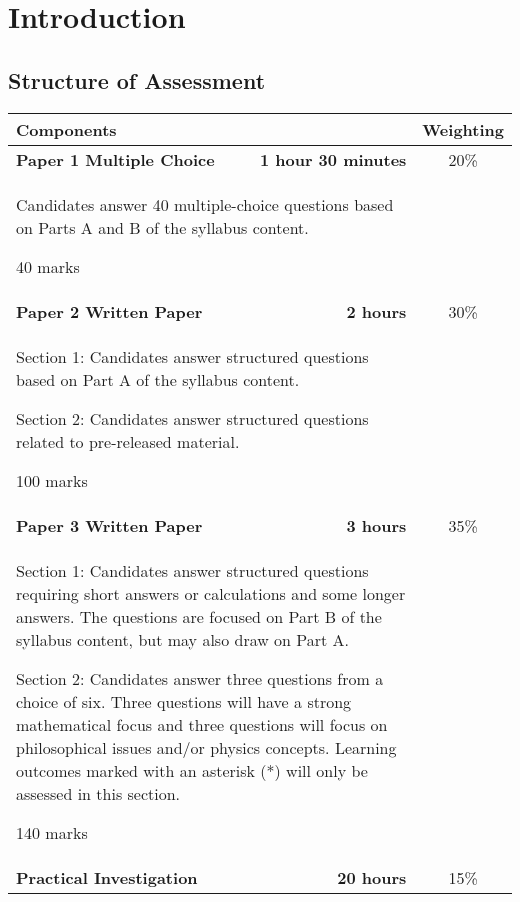 \documentclass[main.tex]{subfiles}
\begin{document}
\chapter{Introduction}
\section{Structure of Assessment}
\begin{table}[ht]
  \begin{tabular}{|lr|c|}
    \hline
    \textbf{Components} & & \textbf{Weighting} \\
    \hline
    \textbf{Paper 1 Multiple Choice} & \textbf{1 hour 30 minutes} & 20\% \\
    \multicolumn{2}{|p{10cm}|}{Candidates answer 40 multiple-choice questions based on Parts A and B of the syllabus content.

40 marks} & \\ \hline
\textbf{Paper 2 Written Paper} & \textbf{2 hours} & 30\% \\
\multicolumn{2}{|p{10cm}|}{Section 1: Candidates answer structured questions based on Part A of the syllabus
content.

Section 2: Candidates answer structured questions related to pre-released material.

100 marks} & \\ \hline
\textbf{Paper 3 Written Paper} & \textbf{3 hours} & 35\% \\
\multicolumn{2}{|p{10cm}|}{Section 1: Candidates answer structured questions requiring short answers or calculations and some longer answers. The questions are focused on Part B of the syllabus content, but may also draw on Part A.

Section 2: Candidates answer three questions from a choice of six. Three questions will have a strong mathematical focus and three questions will focus on philosophical issues and/or physics concepts. Learning outcomes marked with an asterisk (*) will only be assessed in this section.

140 marks} & \\ \hline
\textbf{Practical Investigation} & \textbf{20 hours} & 15\% \\
\hline
  \end{tabular}
\end{table}
\end{document}
